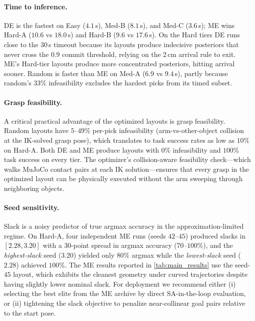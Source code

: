 \documentclass[letterpaper, 10pt, conference]{ieeeconf}
\begin{document}
\paragraph{Time to inference.}
DE is the fastest on Easy ($4.1$\,s), Med-B ($8.1$\,s), and Med-C
($3.6$\,s); ME wins Hard-A ($10.6$ vs $18.0$\,s) and Hard-B
($9.6$ vs $17.6$\,s). On the Hard tiers DE runs close to the
$30$\,s timeout because its layouts produce indecisive posteriors
that never cross the $0.9$ commit threshold, relying on the $2$\,cm
arrival rule to exit. ME's Hard-tier layouts produce more
concentrated posteriors, hitting arrival sooner. Random is faster
than ME on Med-A ($6.9$ vs $9.4$\,s), partly because random's $33\%$
infeasibility excludes the hardest picks from its timed subset.

\paragraph{Grasp feasibility.}
A critical practical advantage of the optimized layouts is grasp
feasibility.  Random layouts have $5$--$49\%$ per-pick infeasibility
(arm-vs-other-object collision at the IK-solved grasp pose), which
translates to task success rates as low as $10\%$ on Hard-A. Both
DE and ME produce layouts with $0\%$ infeasibility and $100\%$
task success on every tier.  The optimizer's collision-aware feasibility
check---which walks MuJoCo contact pairs at each IK solution---ensures
that every grasp in the optimized layout can be physically executed
without the arm sweeping through neighboring objects.

\paragraph{Seed sensitivity.}
Slack is a noisy predictor of true argmax accuracy in the
approximation-limited regime.  On Hard-A, four independent ME runs
(seeds $42$--$45$) produced slacks in $[2.28, 3.20]$ with a
$30$-point spread in argmax accuracy ($70$--$100\%$), and the
\emph{highest-slack} seed ($3.20$) yielded only $80\%$ argmax
while the \emph{lowest-slack} seed ($2.28$) achieved $100\%$.
The ME results reported in \cref{tab:main_results} use the seed-$45$
layout, which exhibits the cleanest geometry under curved trajectories
despite having slightly lower nominal slack.  For deployment we
recommend either (i) selecting the best elite from the ME archive by
direct SA-in-the-loop evaluation, or (ii) tightening the slack
objective to penalize near-collinear goal pairs relative to the
start pose.
\end{document}
